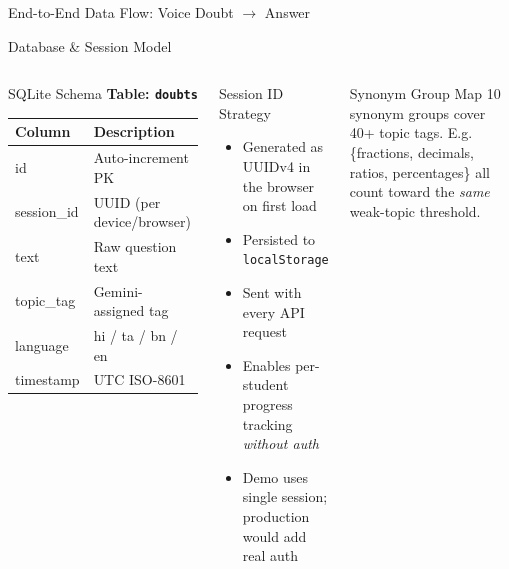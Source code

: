 \documentclass[aspectratio=169, 12pt]{beamer}
\begin{document}
\begin{frame}{End-to-End Data Flow: Voice Doubt \texorpdfstring{$\to$}{->} Answer}
\end{frame}

\begin{frame}{Database \& Session Model}
  \begin{columns}[T]
      \begin{block}{SQLite Schema}
        \textbf{Table: \texttt{doubts}}\\[4pt]
        \renewcommand{\arraystretch}{1.3}
        \begin{tabular}{>{\ttfamily\small}l >{\small}l}
          \toprule
          Column & Description\\
          \midrule
          id & Auto-increment PK\\
          session\_id & UUID (per device/browser)\\
          text & Raw question text\\
          topic\_tag & Gemini-assigned tag\\
          language & hi / ta / bn / en\\
          timestamp & UTC ISO-8601\\
          \bottomrule
        \end{tabular}
      \end{block}
      \begin{block}{Session ID Strategy}
        \begin{itemize}\small
          \item Generated as UUIDv4 in the browser on first load
          \item Persisted to \texttt{localStorage}
          \item Sent with every API request
          \item Enables per-student progress tracking \emph{without auth}
          \item Demo uses single session; production would add real auth
        \end{itemize}
      \end{block}
      \vspace{6pt}
      \begin{block}{Synonym Group Map}
        \small 10 synonym groups cover 40+ topic tags.
        E.g. \{fractions, decimals, ratios, percentages\} all
        count toward the \emph{same} weak-topic threshold.
      \end{block}
  \end{columns}
\end{frame}
\end{document}

